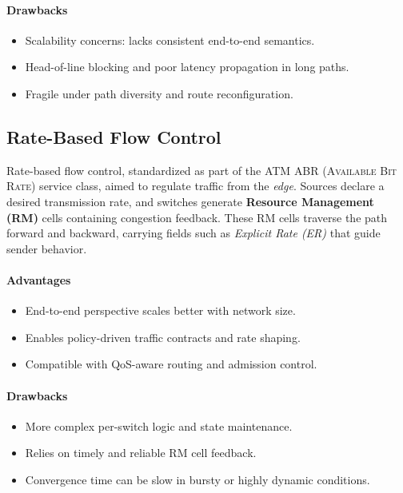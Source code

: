 \documentclass[../../../OAE-SPEC-MAIN.tex]{subfiles}
\begin{document}
\paragraph{Drawbacks}
\begin{itemize}
  \item Scalability concerns: lacks consistent end-to-end semantics.
  \item Head-of-line blocking and poor latency propagation in long paths.
  \item Fragile under path diversity and route reconfiguration.
\end{itemize}


\subsection{Rate-Based Flow Control}

Rate-based flow control, standardized as part of the ATM \textsc{ABR (Available Bit Rate)} service class, aimed to regulate traffic from the \textit{edge}. Sources declare a desired transmission rate, and switches generate \textbf{Resource Management (RM)} cells containing congestion feedback. These RM cells traverse the path forward and backward, carrying fields such as \textit{Explicit Rate (ER)} that guide sender behavior.

\paragraph{Advantages}
\begin{itemize}
  \item End-to-end perspective scales better with network size.
  \item Enables policy-driven traffic contracts and rate shaping.
  \item Compatible with QoS-aware routing and admission control.
\end{itemize}

\paragraph{Drawbacks}
\begin{itemize}
  \item More complex per-switch logic and state maintenance.
  \item Relies on timely and reliable RM cell feedback.
  \item Convergence time can be slow in bursty or highly dynamic conditions.
\end{itemize}
\end{document}

